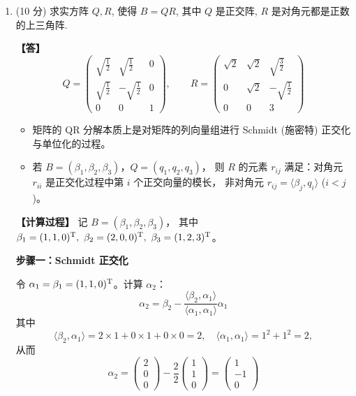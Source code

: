 \begin{enumerate}
因此，$A$ 的非零奇异值为这些非零特征值的平方根：
\[\sigma_1=\sqrt{1}=1,\quad \sigma_2=\sqrt{4}=2,\quad \sigma_3=\sqrt{9}=3.\]
所以 $A$ 的所有非零奇异值为 $1,2,3$。

\item (10 分) 求实方阵 $Q,R$, 使得 $B=QR$, 
其中 $Q$ 是正交阵, $R$ 是对角元都是正数的上三角阵.

\textbf{【答】}
\[
Q=
\begin{pmatrix}
\sqrt{\tfrac12} & \sqrt{\tfrac12} & 0 \\
\sqrt{\tfrac12} & -\sqrt{\tfrac12} & 0 \\
0 & 0 & 1
\end{pmatrix},
\qquad
R=
\begin{pmatrix}
\sqrt2 & \sqrt2 & \sqrt{\tfrac32} \\
0 & \sqrt2 & -\sqrt{\tfrac12} \\
0 & 0 & 3
\end{pmatrix}
\]

\begin{itemize}
\item 矩阵的 QR 分解本质上是对矩阵的列向量组进行 Schmidt (施密特) 正交化与单位化的过程。
\item 若 $B=(\beta_1,\beta_2,\beta_3)$，$Q=(q_1,q_2,q_3)$，
则 $R$ 的元素 $r_{ij}$ 满足：对角元 $r_{ii}$ 是正交化过程中第 $i$ 个正交向量的模长，
非对角元 $r_{ij}=\langle\beta_j,q_i\rangle$ ($i<j$)。
\end{itemize}

\textbf{【计算过程】} 记 $B=(\beta_1,\beta_2,\beta_3)$，
其中 $\beta_1=(1,1,0)^{\rm T},\ \beta_2=(2,0,0)^{\rm T},\ \beta_3=(1,2,3)^{\rm T}$。

\textbf{步骤一：Schmidt 正交化}

令 $\alpha_1=\beta_1=(1,1,0)^{\rm T}$。计算 $\alpha_2$：
\[\alpha_2=\beta_2-\frac{\langle\beta_2,\alpha_1\rangle}{\langle\alpha_1,\alpha_1\rangle}\alpha_1\]
其中
\[\langle\beta_2,\alpha_1\rangle=2\times1+0\times1+0\times0=2,
\quad\langle\alpha_1,\alpha_1\rangle=1^2+1^2=2,\]
从而
\[\alpha_2=
\begin{pmatrix}2\\0\\0\end{pmatrix}
-\frac{2}{2}
\begin{pmatrix}1\\1\\0\end{pmatrix}
=
\begin{pmatrix}1\\-1\\0\end{pmatrix}\]


\end{enumerate}
